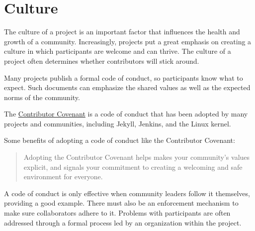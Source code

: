 


\chapter{Culture}

The culture of a project is an important factor that influences the health and growth of a community.  Increasingly, projects put a great emphasis on creating a culture in which participants are welcome and can thrive.  The culture of a project often determines whether contributors will stick around.

Many projects publish a formal code of conduct, so participants know what to expect.  Such documents can emphasize the shared values as well as the expected norms of the community.

The \href{https://www.contributor-covenant.org/}{Contributor Covenant} is a code of conduct that has been adopted by many projects and communities, including Jekyll, Jenkins, and the Linux kernel.

\begin{kaobox}[frametitle=Contributor Covenant]

Some benefits of adopting a code of conduct like the Contributor Covenant:

\begin{quote}

Adopting the Contributor Covenant helps makes your community's values explicit, and signals your commitment to creating a welcoming and safe environment for everyone.

\end{quote}

\end{kaobox}

A code of conduct is only effective when community leaders follow it themselves, providing a good example.  There must also be an enforcement mechanism to make sure collaborators adhere to it.  Problems with participants are often addressed through a formal process led by an organization within the project.

\newpage

